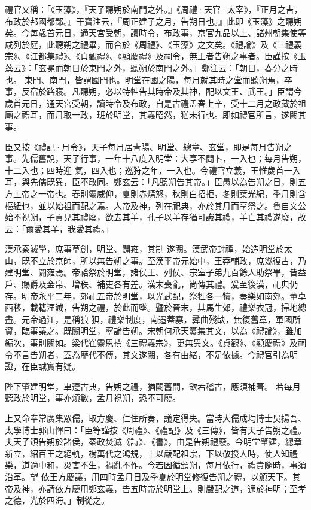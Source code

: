 \begin{pinyinscope}
 禮官又稱：「《玉藻》，『天子聽朔於南門之外。』《周禮·天官·太宰》，『正月之吉，布政於邦國都鄙。』干寶注云，『周正建子之月，告朔日也。』此即《玉藻》之聽朔矣。今每歲首元日，通天宮受朝，讀時令，布政事，京官九品以上、諸州朝集使等咸列於庭，此聽朔之禮畢，而合於《周禮》、《玉藻》之文矣。《禮論》及《三禮義宗》、《江都集禮》、《貞觀禮》、《顯慶禮》及祠令，無王者告朔之事者。臣謹按《玉藻云》：「玄冕而朝日於東門之外，聽朔於南門之外。」鄭注云：「朝日，春分之時也。
 東門、南門，皆謂國門也。明堂在國之陽，每月就其時之堂而聽朔焉，卒事，反宿於路寢。凡聽朔，必以特牲告其時帝及其神，配以文王、武王。」臣謂今歲首元日，通天宮受朝，讀時令及布政，自是古禮孟春上辛，受十二月之政藏於祖廟之禮耳，而月取一政，班於明堂，其義昭然，猶未行也。即如禮官所言，遂闕其事。



 臣又按《禮記·月令》，天子每月居青陽、明堂、總章、玄堂，即是每月告朔之事。先儒舊說，天子行事，一年十八度入明堂：大享不問卜，一入也；每月告朔，十二入也；四時迎
 氣，四入也；巡狩之年，一入也。今禮官立義，王惟歲首一入耳，與先儒既異，臣不敢同。鄭玄云：「凡聽朔告其帝。」臣愚以為告朔之日，則五方上帝之一帝也。春則靈威仰，夏則赤熛怒，秋則白招拒，冬則葉光紀，季月則含樞紐也，並以始祖而配之焉。人帝及神，列在祀典，亦於其月而享祭之。魯自文公始不視朔，子貢見其禮廢，欲去其羊，孔子以羊存猶可識其禮，羊亡其禮遂廢，故云：「爾愛其羊，我愛其禮。」



 漢承秦滅學，庶事草創，明堂、闢雍，其制
 遂闕。漢武帝封禪，始造明堂於太山，既不立於京師，所以無告朔之事。至漢平帝元始中，王莽輔政，庶幾復古，乃建明堂、闢雍焉。帝祫祭於明堂，諸侯王、列侯、宗室子弟九百餘人助祭畢，皆益戶、賜爵及金帛、增秩、補吏各有差。漢末喪亂，尚傳其禮。爰至後漢，祀典仍存。明帝永平二年，郊祀五帝於明堂，以光武配，祭牲各一犢，奏樂如南郊。董卓西移，載籍湮滅，告朔之禮，於此而墜。暨於晉末，其馬生郊，禮樂衣冠，掃地總盡。元帝過江，是稱狼
 狽，禮樂制度，南遷蓋寡，彞曲殘缺，無復舊章，軍國所資，臨事議之。既闕明堂，寧論告朔。宋朝何承天纂集其文，以為《禮論》，雖加編次，事則闕如。梁代崔靈恩撰《三禮義宗》，更無異文。《貞觀》、《顯慶禮》及祠令不言告朔者，蓋為歷代不傳，其文遂闕，各有由緒，不足依據。今禮官引為明證，在臣誠實有疑。



 陛下肇建明堂，聿遵古典，告朔之禮，猶闕舊間，欽若稽古，應須補葺。
 若每月聽政於明堂，事亦煩數，孟月視朔，恐不可廢。



 上又命奉常廣集眾儒，取方慶、仁住所奏，議定得失。當時大儒成均博士吳揚吾、太學博士郭山惲曰：「臣等謹按《周禮》、《禮記》及《三傳》，皆有天子告朔之禮。夫天子頒告朔於諸侯，秦政焚滅《詩》、《書》，由是告朔禮廢。今明堂肇建，總章新立，紹百王之絕軌，樹萬代之鴻規，上以嚴配祖宗，下以敬授人時，使人知禮樂，道適中和，災害不生，禍亂不作。今若因循頒朔，每月依行，禮貴隨時，事須沿革。望
 依王方慶議，用四時孟月日及季夏於明堂修復告朔之禮，以頒天下。其帝及神，亦請依方慶用鄭玄義，告五時帝於明堂上。則嚴配之道，通於神明；至孝之德，光於四海。」制從之。




\end{pinyinscope}
